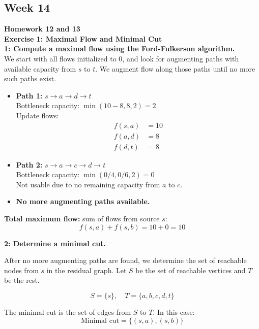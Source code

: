 \documentclass{article}
\theoremstyle{theorem}
\theoremstyle{definition}
\theoremstyle{remark}
\begin{document}
\subsection{Week 14}
\textbf{Homework 12 and 13}\\
\textbf{Exercise 1: Maximal Flow and Minimal Cut} \\
\textbf{1: Compute a maximal flow using the Ford-Fulkerson algorithm.}\\
We start with all flows initialized to 0, and look for augmenting paths with available capacity from $s$ to $t$. We augment flow along those paths until no more such paths exist.

\begin{itemize}
    \item \textbf{Path 1:} $s \rightarrow a \rightarrow d \rightarrow t$ \\
    Bottleneck capacity: $\min(10 - 8, 8, 2) = 2$ \\
    Update flows: 
    \begin{align*}
        f(s,a) & = 10 \\
        f(a,d) & = 8 \\
        f(d,t) & = 8
    \end{align*}

    \item \textbf{Path 2:} $s \rightarrow a \rightarrow c \rightarrow d \rightarrow t$ \\
    Bottleneck capacity: $\min(0/4, 0/6, 2) = 0$ \\
    Not usable due to no remaining capacity from $a$ to $c$.

    \item \textbf{No more augmenting paths available.}
\end{itemize}

\textbf{Total maximum flow:} sum of flows from source $s$:
\[
f(s,a) + f(s,b) = 10 + 0 = \boxed{10}
\]

\vspace{0.5em}

\textbf{2: Determine a minimal cut.}

After no more augmenting paths are found, we determine the set of reachable nodes from $s$ in the residual graph. Let $S$ be the set of reachable vertices and $T$ be the rest.

\[
S = \{s\}, \quad T = \{a, b, c, d, t\}
\]

The minimal cut is the set of edges from $S$ to $T$. In this case:
\[
\text{Minimal cut} = \{(s, a), (s, b)\}
\]
\end{document}
